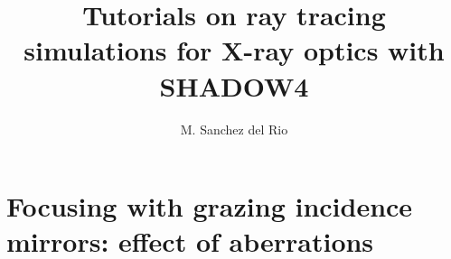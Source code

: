 \documentclass{ol-softwaremanual}
\title{Tutorials on ray tracing simulations for X-ray optics with SHADOW4}
\author{M. Sanchez del Rio}
\begin{document}
\maketitle

\tableofcontents


\newpage
\section{Focusing with grazing incidence mirrors: effect of aberrations}


\end{document}
